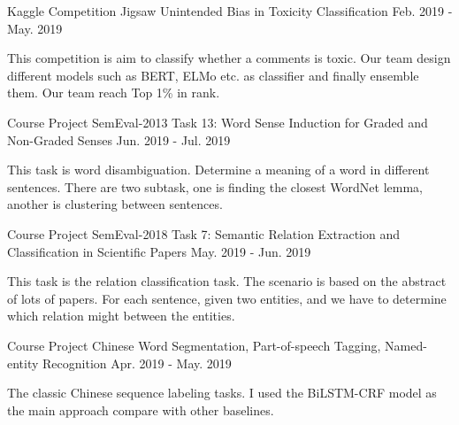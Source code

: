 \begin{cventries}
  \cventry
    {Kaggle Competition} %
    {Jigsaw Unintended Bias in Toxicity Classification} %
    {} %
    {Feb. 2019 - May. 2019} %
    {
      \begin{cvitems} %
        \item {This competition is aim to classify whether a comments is toxic. Our team design different models such as BERT, ELMo etc. as classifier and finally ensemble them. Our team reach Top 1\% in rank.}
      \end{cvitems}
    }

  \cventry
    {Course Project} %
    {SemEval-2013 Task 13: Word Sense Induction for Graded and Non-Graded Senses} %
    {} %
    {Jun. 2019 - Jul. 2019} %
    {
      \begin{cvitems} %
        \item {This task is word disambiguation. Determine a meaning of a word in different sentences. There are two subtask, one is finding the closest WordNet lemma, another is clustering between sentences.}
      \end{cvitems}
    }

  \cventry
    {Course Project} %
    {SemEval-2018 Task 7: Semantic Relation Extraction and Classification in Scientific Papers} %
    {} %
    {May. 2019 - Jun. 2019} %
    {
      \begin{cvitems} %
        \item {This task is the relation classification task. The scenario is based on the abstract of lots of papers. For each sentence, given two entities, and we have to determine which relation might between the entities.}
      \end{cvitems}
    }

  \cventry
    {Course Project} %
    {Chinese Word Segmentation, Part-of-speech Tagging, Named-entity Recognition} %
    {} %
    {Apr. 2019 - May. 2019} %
    {
      \begin{cvitems} %
        \item {The classic Chinese sequence labeling tasks. I used the BiLSTM-CRF model as the main approach compare with other baselines.}
      \end{cvitems}
    }


\end{cventries}
